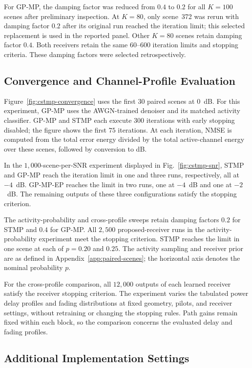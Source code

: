 For GP-MP, the damping factor was reduced from $0.4$ to $0.2$ for all
$K=100$ scenes after preliminary inspection. At $K=80$, only scene~372
was rerun with damping factor $0.2$ after its original run reached the iteration
limit; this selected replacement is used in the reported panel. Other
$K=80$ scenes retain damping factor $0.4$. Both receivers retain the same
$60$--$600$ iteration limits and stopping criteria.
These damping factors were selected retrospectively.

\subsection{Convergence and Channel-Profile Evaluation}

Figure~\ref{fig:cstmp-convergence} uses the first $30$ paired scenes
at $0$~dB. For this experiment, GP-MP uses the AWGN-trained denoiser
and its matched activity classifier. GP-MP and STMP
each execute $300$ iterations with early stopping disabled; the figure
shows the first $75$ iterations. At each iteration, NMSE is computed
from the total error energy divided by the total active-channel energy
over these scenes, followed by conversion to dB.

In the $1{,}000$-scene-per-SNR experiment displayed in
Fig.~\ref{fig:cstmp-snr}, STMP and GP-MP reach the iteration limit
in one and three runs, respectively, all at $-4$~dB. GP-MP-EP reaches
the limit in two runs, one at $-4$~dB and one at $-2$~dB. The remaining
outputs of these three configurations satisfy the stopping criterion.

The activity-probability and cross-profile sweeps retain damping factors $0.2$
for STMP and $0.4$ for GP-MP. All $2{,}500$ proposed-receiver
runs in the activity-probability experiment meet the stopping criterion. STMP reaches the limit in one
scene at each of $p=0.20$ and $0.25$.
The activity sampling and receiver prior are as defined in
Appendix~\ref{app:paired-scenes}; the horizontal axis denotes
the nominal probability $p$.

For the cross-profile comparison, all $12{,}000$ outputs of each learned
receiver satisfy the receiver stopping criterion.
The experiment varies the tabulated power delay profiles and
fading distributions at fixed geometry, pilots, and receiver settings,
without retraining or changing the stopping rules. Path gains remain fixed within each block, so the comparison concerns
the evaluated delay and fading profiles.

\subsection{Additional Implementation Settings}
\label{app:implementation-settings}

